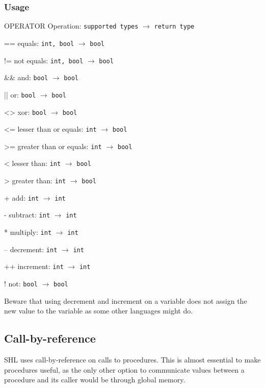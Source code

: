 \documentclass[twoside]{report}
\newenvironment{mycompactdesc}{\begin{adjustwidth}{0.53cm}{}\begin{compactdesc}}{\end{compactdesc}\end{adjustwidth}}
\begin{document}
\subsubsection*{Usage}
\begin{mycompactdesc}
	\item[OPERATOR] Operation: \texttt{supported types} $\rightarrow$ \texttt{return type}
	\item[==] equals: \texttt{int, bool} $\rightarrow$ \texttt{bool}
	\item[!=] not equals: \texttt{int, bool} $\rightarrow$ \texttt{bool}
	\item[\&\&] and: \texttt{bool} $\rightarrow$ \texttt{bool}
	\item[||] or: \texttt{bool} $\rightarrow$ \texttt{bool}
	\item[<>] xor: \texttt{bool} $\rightarrow$ \texttt{bool}
	\item[<=] lesser than or equals: \texttt{int} $\rightarrow$ \texttt{bool}
	\item[>=] greater than or equals: \texttt{int} $\rightarrow$ \texttt{bool}
	\item[<] lesser than: \texttt{int} $\rightarrow$ \texttt{bool}
	\item[>] greater than: \texttt{int} $\rightarrow$ \texttt{bool}
	\item[+] add: \texttt{int} $\rightarrow$ \texttt{int}
	\item[-] subtract: \texttt{int} $\rightarrow$ \texttt{int}
	\item[*] multiply: \texttt{int} $\rightarrow$ \texttt{int}
	\item[--] decrement: \texttt{int} $\rightarrow$ \texttt{int}
	\item[++] increment: \texttt{int} $\rightarrow$ \texttt{int}
	\item[!] not: \texttt{bool} $\rightarrow$ \texttt{bool}
\end{mycompactdesc}
Beware that using decrement and increment on a variable does not assign the new value to the variable as some other languages might do.


\subsection{Call-by-reference}
\label{def:call-by-reference}
SHL uses call-by-reference on calls to procedures. This is almost essential to make procedures useful, as the only other option to communicate values between a procedure and its caller would be through global memory. 
\end{document}
